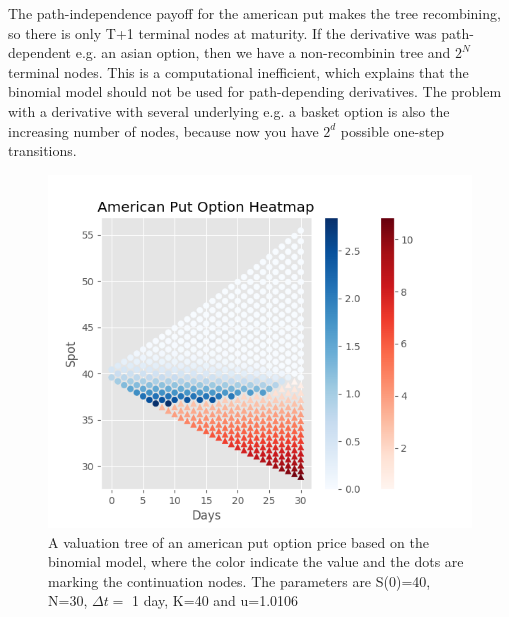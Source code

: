 The path-independence payoff for the american put makes the tree recombining, so there is only T+1 terminal nodes at maturity. If the derivative was path-dependent e.g. an asian option, then we have a non-recombinin tree and $2^{N}$ terminal nodes. This is a computational inefficient, which explains that the binomial model should not be used for path-depending derivatives. The problem with a derivative with several underlying e.g. a basket option is also the increasing number of nodes, because now you have $2^d$ possible one-step transitions.

\begin{figure}[H]
\centering
\includegraphics{Figures/BinomialTree.png}
\decoRule
\caption[Binomial Tree]{A valuation tree of an american put option price based on the binomial model, where the color indicate the value and the dots are marking the continuation nodes. The parameters are S(0)=40, N=30, $\Delta t =$ 1 day, K=40 and u=1.0106}
\label{fig:BinomialTree}
\end{figure}

